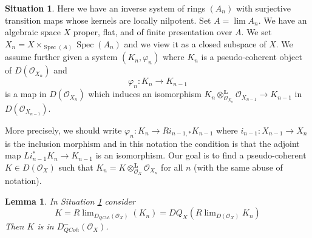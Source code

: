 \documentclass{stacks-project}
\theoremstyle{plain}
\newtheorem{lemma}[subsection]{Lemma}
\theoremstyle{definition}
\newtheorem{situation}[subsection]{Situation}
\theoremstyle{remark}
\numberwithin{equation}{subsection}
\def\lim{\mathop{\mathrm{lim}}\nolimits}
\def\Spec{\mathop{\mathrm{Spec}}}
\def\QCoh{\mathit{QCoh}}
\begin{document}
\begin{situation}
\label{situation-existence-derived}
Here we have an inverse system of rings $(A_n)$ with surjective transition
maps whose kernels are locally nilpotent. Set $A = \lim A_n$. We have an
algebraic space $X$ proper, flat, and of finite presentation over $A$.
We set $X_n = X \times_{\Spec(A)} \Spec(A_n)$ and we
view it as a closed subspace of $X$. We assume further given a system
$(K_n, \varphi_n)$ where $K_n$ is a pseudo-coherent object of
$D(\mathcal{O}_{X_n})$ and
$$
\varphi_n : K_n \longrightarrow K_{n - 1}
$$
is a map in $D(\mathcal{O}_{X_n})$ which induces an isomorphism
$K_n \otimes_{\mathcal{O}_{X_n}}^\mathbf{L} \mathcal{O}_{X_{n - 1}}
\to K_{n - 1}$ in $D(\mathcal{O}_{X_{n - 1}})$.
\end{situation}

\noindent
More precisely, we should write
$\varphi_n : K_n \to Ri_{n - 1, *}K_{n - 1}$
where $i_{n - 1} : X_{n - 1} \to X_n$ is the inclusion morphism
and in this notation the condition is that the adjoint
map $Li_{n - 1}^*K_n \to K_{n - 1}$ is an isomorphism.
Our goal is to find a pseudo-coherent $K \in D(\mathcal{O}_X)$
such that $K_n = K \otimes_{\mathcal{O}_X}^\mathbf{L} \mathcal{O}_{X_n}$
for all $n$ (with the same abuse of notation).

\begin{lemma}
\label{lemma-compute-what-it-should-be-derived}
In Situation \ref{situation-existence-derived} consider
$$
K = R\lim_{D_\QCoh(\mathcal{O}_X)}(K_n) =
DQ_X(R\lim_{D(\mathcal{O}_X)} K_n)
$$
Then $K$ is in $D^-_{\QCoh}(\mathcal{O}_X)$.
\end{lemma}
\end{document}
